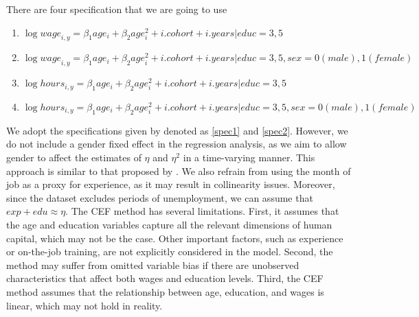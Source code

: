 \documentclass[12pt]{article}
\begin{document}
There are four specification that we are going to use 
\begin{enumerate}
    \item   \label{spec1}    \(\log{wage}_{i,y}=   \beta_1 age_{i}+ \beta_2 age_{i}^2+i.cohort+i.years |educ={3,5}\)
    \item   \label{spec2}    \(\log{wage}_{i,y}=   \beta_1 age_{i}+ \beta_2 age_{i}^2+i.cohort+i.years |educ={3,5},sex=
    {0 (male), 1 (female)}\)
    \item  \label{spec3}    \(\log{hours}_{i,y}=  \beta_1 age_{i}+ \beta_2 age_{i}^2+i.cohort+i.years |educ={3,5}\)
    \item   \label{spec4}    \(\log{hours}_{i,y}= \beta_1 age_{i}+ \beta_2 age_{i}^2+i.cohort+i.years |educ={3,5},sex=
    {0 (male), 1 (female)}\)
\end{enumerate}
We adopt the specifications given by \citet{hendricks2013ben} denoted as \ref{spec1} and \ref{spec2}. However, we do not
include a gender fixed effect in the regression analysis, as we aim to allow gender to affect the estimates of $\eta$
and $\eta^2$ in a time-varying manner. This approach is similar to that proposed by \citet{joshi2021gender}. We also
refrain from using the month of job as a proxy for experience, as it may result in collinearity issues. Moreover, since
the dataset excludes periods of unemployment, we can assume that $exp + edu \approx \eta$. The CEF method has several
limitations. First, it assumes that the age and education variables capture all the relevant dimensions of human
capital, which may not be the case. Other important factors, such as experience or on-the-job training, are not
explicitly considered in the model. Second, the method may suffer from omitted variable bias if there are unobserved
characteristics that affect both wages and education levels. Third, the CEF method assumes that the relationship between
age, education, and wages is linear, which may not hold in reality. 
\end{document}
